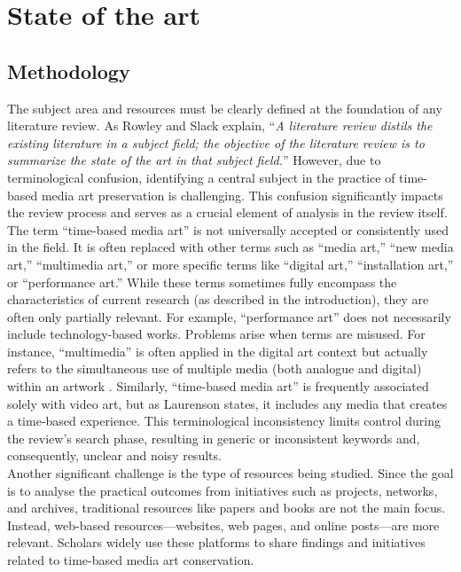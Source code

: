 \chapter{State of the art}

\section{Methodology}
The subject area and resources must be clearly defined at the foundation of any literature review. As Rowley and Slack \cite{rowley2004conducting} explain, “\textit{A literature review distils the existing literature in a subject field; the objective of the literature review is to summarize the state of the art in that subject field.}” However, due to terminological confusion, identifying a central subject in the practice of time-based media art preservation is challenging. This confusion significantly impacts the review process and serves as a crucial element of analysis in the review itself.\\
The term “time-based media art” is not universally accepted or consistently used in the field. It is often replaced with other terms such as “media art,” “new media art,” “multimedia art,” or more specific terms like “digital art,” “installation art,” or “performance art.” While these terms sometimes fully encompass the characteristics of current research (as described in the introduction), they are often only partially relevant. For example, “performance art” does not necessarily include technology-based works. Problems arise when terms are misused. For instance, “multimedia” is often applied in the digital art context but actually refers to the simultaneous use of multiple media (both analogue and digital) within an artwork \cite{friedman2023intermedia}. Similarly, “time-based media art” is frequently associated solely with video art, but as Laurenson  \cite{laurenson2001developing} states, it includes any media that creates a time-based experience. This terminological inconsistency limits control during the review’s search phase, resulting in generic or inconsistent keywords and, consequently, unclear and noisy results.\\
Another significant challenge is the type of resources being studied. Since the goal is to analyse the practical outcomes from initiatives such as projects, networks, and archives, traditional resources like papers and books are not the main focus. Instead, web-based resources—websites, web pages, and online posts—are more relevant. Scholars widely use these platforms to share findings and initiatives related to time-based media art conservation.

